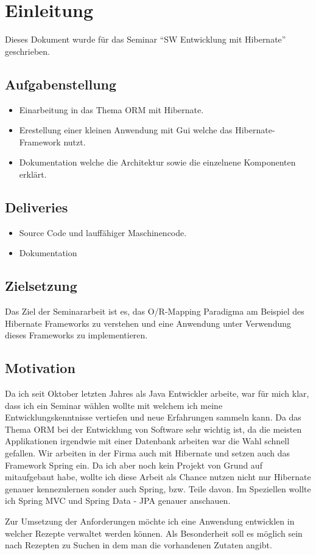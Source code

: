 \chapter{Einleitung}
\label{sec:Einleitung}
Dieses Dokument wurde für das Seminar \enquote{SW Entwicklung mit Hibernate} geschrieben.

\section{Aufgabenstellung}
\begin{itemize}
	\item Einarbeitung in das Thema ORM mit Hibernate.
	\item Erestellung einer kleinen Anwendung mit Gui welche das Hibernate-Framework nutzt.
	\item Dokumentation welche die Architektur sowie die einzelnene Komponenten erklärt.
\end{itemize}


\section{Deliveries}
\begin{itemize}
	\item Source Code und lauffähiger Maschinencode.
	\item Dokumentation
\end{itemize}

\section{Zielsetzung}
Das Ziel der Seminararbeit ist es, das O/R-Mapping Paradigma am Beispiel des Hibernate Frameworks zu verstehen und eine Anwendung unter Verwendung dieses Frameworks zu implementieren.

\section{Motivation}
Da ich seit Oktober letzten Jahres als Java Entwickler arbeite, war für mich klar, dass ich ein Seminar wählen wollte mit welchem ich meine Entwicklungskenntnisse vertiefen und neue Erfahrungen sammeln kann. Da das Thema ORM bei der Entwicklung von Software sehr wichtig ist, da die meisten Applikationen irgendwie mit einer Datenbank arbeiten war die Wahl schnell gefallen. Wir arbeiten in der Firma auch mit Hibernate und setzen auch das Framework Spring ein. Da ich aber noch kein Projekt von Grund auf mitaufgebaut habe, wollte ich diese Arbeit als Chance nutzen nicht nur Hibernate genauer kennezulernen sonder auch Spring, bzw. Teile davon. Im Speziellen wollte ich Spring MVC und Spring Data - JPA genauer anschauen.

Zur Umsetzung der Anforderungen möchte ich eine Anwendung entwicklen in welcher Rezepte verwaltet werden können. Als Besonderheit soll es möglich sein nach Rezepten zu Suchen in dem man die vorhandenen Zutaten angibt. 